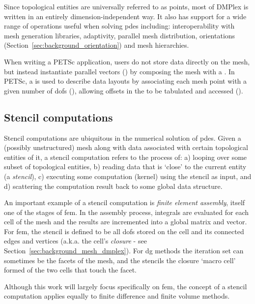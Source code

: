 Since topological entities are universally referred to as points, most of DMPlex is written in an entirely dimension-independent way.
It also has support for a wide range of operations useful when solving \glspl{pde} including: interoperability with mesh generation libraries, adaptivity, parallel mesh distribution, orientations (Section~\ref{sec:background_orientation}) and mesh hierarchies.

When writing a PETSc application, users do not store data directly on the mesh, but instead instantiate parallel vectors () by composing the mesh with a .
In PETSc, a  is used to describe data layouts by associating each mesh point with a given number of \glspl{dof} (), allowing offsets in the  to be tabulated and accessed ().

\subsection{Stencil computations}

Stencil computations are ubiquitous in the numerical solution of \glspl{pde}.
Given a (possibly unstructured) mesh along with data associated with certain topological entities of it, a stencil computation refers to the process of:
a) looping over some subset of topological entities,
b) reading data that is `close' to the current entity (a \textit{stencil}),
c) executing some computation (kernel) using the stencil as input, and
d) scattering the computation result back to some global data structure.

An important example of a stencil computation is \textit{finite element assembly}, itself one of the stages of \gls{fem}.
In the assembly process, integrals are evaluated for each cell of the mesh and the results are incremented into a global matrix and vector.
For \gls{fem}, the stencil is defined to be all \glspl{dof} stored on the cell and its connected edges and vertices (a.k.a. the cell's \textit{closure} - see Section~\ref{sec:background_mesh_dmplex}).
For \gls{dg} methods the iteration set can sometimes be the facets of the mesh, and the stencils the closure `macro cell' formed of the two cells that touch the facet.

Although this work will largely focus specifically on \gls{fem}, the concept of a stencil computation applies equally to finite difference and finite volume methods.

